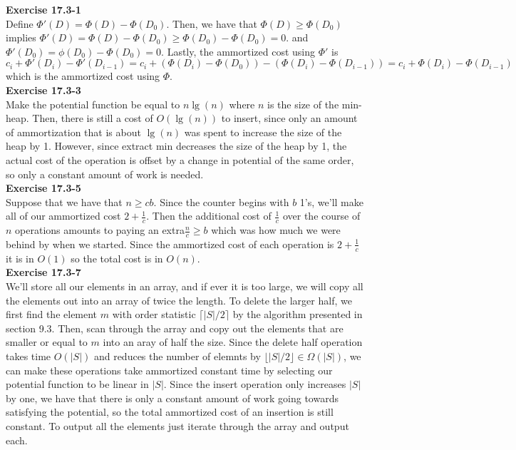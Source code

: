 \documentclass{article}
\begin{document}
\noindent\textbf{Exercise 17.3-1}\\
Define $\Phi'(D) = \Phi(D) -\Phi(D_0)$. Then, we have that $\Phi(D) \ge \Phi(D_0)$ implies $\Phi'(D)  = \Phi(D) - \Phi(D_0) \ge \Phi(D_0) -\Phi(D_0) = 0$. and $\Phi'(D_0) = \phi(D_0)-\Phi(D_0) = 0$. Lastly, the ammortized cost using $\Phi'$ is $c_i + \Phi'(D_i) -\Phi'(D_{i-1}) = c_i + (\Phi(D_i) - \Phi(D_0)) - (\Phi(D_i) -\Phi(D_{i-1})) = c_i + \Phi(D_i) -\Phi(D_{i-1})$ which is the ammortized cost using $\Phi$.\\

\noindent\textbf{Exercise 17.3-3}\\
Make the potential function be equal to $n\lg(n)$ where $n$ is the size of the min-heap. Then, there is still a cost of $O(\lg(n))$ to insert, since only an amount of ammortization that is about $\lg(n)$ was spent to increase the size of the heap by 1. However, since extract min decreases the size of the heap by 1, the actual cost of the operation is offset by a change in potential of the same order, so only a constant amount of work is needed.\\
 


\noindent\textbf{Exercise 17.3-5}\\
Suppose that we have that $n\ge c b$. Since the counter begins with $b$ 1's, we'll make all of our ammortized cost $2+ \frac{1}{c}$. Then the additional cost of $\frac{1}{c}$ over the course of $n$ operations amounts to paying an extra$\frac{n}{c} \ge b$ which was how much we were behind by when we started. Since the ammortized cost of each operation is $2+\frac{1}{c}$ it is in $O(1)$ so the total cost is in $O(n)$.\\

\noindent\textbf{Exercise 17.3-7}\\
We'll store all our elements in an array, and if ever it is too large, we will copy all the elements out into an array of twice the length. To delete the larger half, we first find the element $m$ with order statistic $\lceil|S|/2\rceil$ by the algorithm presented in section 9.3. Then, scan through the array and copy out the elements that are smaller or equal to $m$ into an aray of half the size. Since the delete half operation takes time $O(|S|)$ and reduces the number of elemnts by $\lfloor|S|/2\rfloor \in \Omega(|S|)$, we can make these operations take ammortized constant time by selecting our potential function to be linear in $|S|$. Since the insert operation only increases $|S|$ by one, we have that there is only a constant amount of work going towards satisfying the potential, so the total ammortized cost of an insertion is still constant. To output all the elements just iterate through the array and output each.\\
\end{document}

